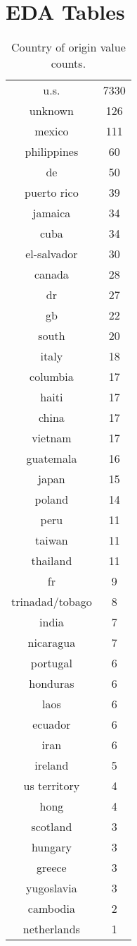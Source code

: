 \section{EDA Tables}

\begin{table}[!h]
    \caption{Country of origin value counts.}
    \label{tab:contry_of_origin_value_counts}
    \centering
    \begin{tabular}{cc}
        u.s. & 7330 \\
        unknown & 126 \\
        mexico & 111 \\
        philippines & 60 \\
        de & 50 \\
        puerto rico & 39 \\
        jamaica & 34 \\
        cuba & 34 \\
        el-salvador & 30 \\
        canada & 28 \\
        dr & 27 \\
        gb & 22 \\
        south & 20 \\
        italy & 18 \\
        columbia & 17 \\
        haiti & 17 \\
        china & 17 \\
        vietnam & 17 \\
        guatemala & 16 \\
        japan & 15 \\
        poland & 14 \\
        peru & 11 \\
        taiwan & 11 \\
        thailand & 11 \\
        fr & 9 \\
        trinadad/tobago & 8 \\
        india & 7 \\
        nicaragua & 7 \\
        portugal & 6 \\
        honduras & 6 \\
        laos & 6 \\
        ecuador & 6 \\
        iran & 6 \\
        ireland & 5 \\
        us territory & 4 \\
        hong & 4 \\
        scotland & 3 \\
        hungary & 3 \\
        greece & 3 \\
        yugoslavia & 3 \\
        cambodia & 2 \\
        netherlands & 1 \\
    \end{tabular}
\end{table}

